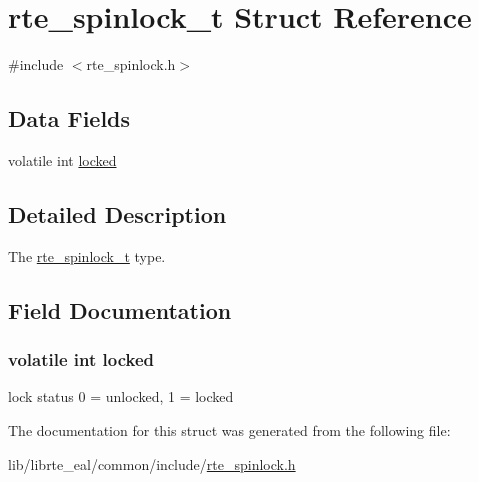\hypertarget{structrte__spinlock__t}{}\section{rte\+\_\+spinlock\+\_\+t Struct Reference}
\label{structrte__spinlock__t}


{\ttfamily \#include $<$rte\+\_\+spinlock.\+h$>$}

\subsection*{Data Fields}
\begin{DoxyCompactItemize}
\item 
volatile int \hyperlink{structrte__spinlock__t_acd48b8bda1a7b6b8f687211f5be5bb1d}{locked}
\end{DoxyCompactItemize}


\subsection{Detailed Description}
The \hyperlink{structrte__spinlock__t}{rte\+\_\+spinlock\+\_\+t} type. 

\subsection{Field Documentation}
\hypertarget{structrte__spinlock__t_acd48b8bda1a7b6b8f687211f5be5bb1d}{}
\subsubsection[{locked}]{\setlength{\rightskip}{0pt plus 5cm}volatile int locked}\label{structrte__spinlock__t_acd48b8bda1a7b6b8f687211f5be5bb1d}
lock status 0 = unlocked, 1 = locked 

The documentation for this struct was generated from the following file\+:\begin{DoxyCompactItemize}
\item 
lib/librte\+\_\+eal/common/include/\hyperlink{rte__spinlock_8h}{rte\+\_\+spinlock.\+h}\end{DoxyCompactItemize}
